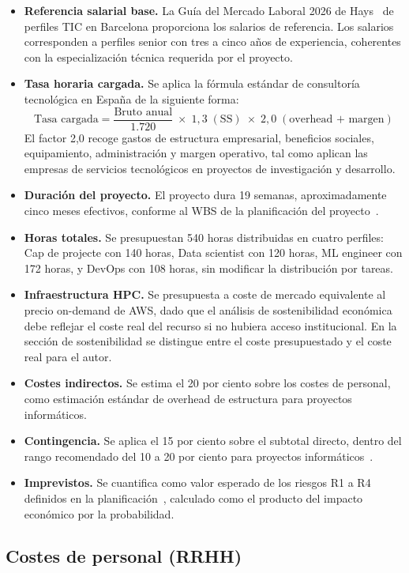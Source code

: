 \begin{itemize}[nosep]
\item \textbf{Referencia salarial base.} La Guía del Mercado Laboral 2026 de Hays~\cite{hays2026} de perfiles TIC en Barcelona proporciona los salarios de referencia. Los salarios corresponden a perfiles senior con tres a cinco años de experiencia, coherentes con la especialización técnica requerida por el proyecto.
\item \textbf{Tasa horaria cargada.} Se aplica la fórmula estándar de consultoría tecnológica en España de la siguiente forma:
\[
\text{Tasa cargada} = \frac{\text{Bruto anual}}{1.720}\;\times\;1{,}3\;(\text{SS})\;\times\;2{,}0\;(\text{overhead + margen})
\]
El factor 2,0 recoge gastos de estructura empresarial, beneficios sociales, equipamiento, administración y margen operativo, tal como aplican las empresas de servicios tecnológicos en proyectos de investigación y desarrollo.
\item \textbf{Duración del proyecto.} El proyecto dura 19 semanas, aproximadamente cinco meses efectivos, conforme al WBS de la planificación del proyecto~\cite{gep23e2}.
\item \textbf{Horas totales.} Se presupuestan 540 horas distribuidas en cuatro perfiles: Cap de projecte con 140 horas, Data scientist con 120 horas, ML engineer con 172 horas, y DevOps con 108 horas, sin modificar la distribución por tareas.
\item \textbf{Infraestructura HPC.} Se presupuesta a coste de mercado equivalente al precio on-demand de AWS, dado que el análisis de sostenibilidad económica debe reflejar el coste real del recurso si no hubiera acceso institucional. En la sección de sostenibilidad se distingue entre el coste presupuestado y el coste real para el autor.
\item \textbf{Costes indirectos.} Se estima el 20 por ciento sobre los costes de personal, como estimación estándar de overhead de estructura para proyectos informáticos.
\item \textbf{Contingencia.} Se aplica el 15 por ciento sobre el subtotal directo, dentro del rango recomendado del 10 a 20 por ciento para proyectos informáticos~\cite{gep23}.
\item \textbf{Imprevistos.} Se cuantifica como valor esperado de los riesgos R1 a R4 definidos en la planificación~\cite{gep23e2}, calculado como el producto del impacto económico por la probabilidad.
\end{itemize}

\subsection{Costes de personal (RRHH)}

